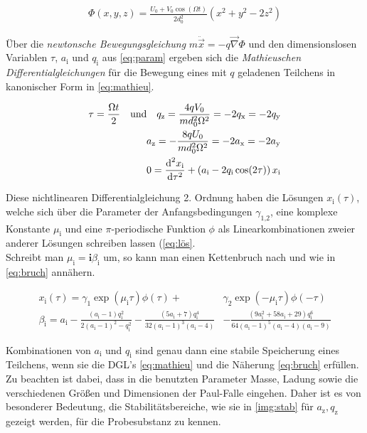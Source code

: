 \documentclass[numbers=noenddot,a4paper,notitlepage,twoside,BCOR15mm]{scrartcl}
\newcommand{\diff}{\textnormal{d}}
\newcommand{\ix}[1]{_\text{#1}}
\newcommand{\imag}{\mathbf{i}}
\newcommand{\tilt}[1]{\textit{#1}}
\begin{document}
			\begin{align}
				\Phi(x,y,z)=\frac{U\ix{0}+V\ix{0}\cos(\Omega t)}{2d\ix{0}^2}(x^2+y^2-2z^2) \label{eq:neupot}
			\end{align}

		Über die \tilt{newtonsche Bewegungsgleichung} $m\ddot{\vec{x}}=-q\vec{\nabla}\Phi$ und den dimensionslosen Variablen $\tau$, $a\ix{i}$ und $q\ix{i}$ aus \autoref{eq:param} ergeben sich die \tilt{Mathieuschen Differentialgleichungen} für die Bewegung eines mit $q$ geladenen Teilchens in kanonischer Form in \autoref{eq:mathieu}.

			\begin{align}
				\tau=\frac{\Omega t}{2} \quad \text{und} \quad q\ix{z}=\frac{4qV\ix{0}}{md\ix{0}^2\Omega^2}=-2q\ix{x}=-2q\ix{y} \label{eq:param}\\
				a\ix{z}=-\frac{8qU\ix{0}}{md\ix{0}^2\Omega^2}=-2a\ix{x}=-2a\ix{y} \nonumber \\
				0=\frac{\diff^2x\ix{i}}{\diff\tau^2}+\left(a\ix{i}-2q\ix{i}\cos(2\tau)\right)x\ix{i} \label{eq:mathieu}
			\end{align}

		Diese nichtlinearen Differentialgleichung 2. Ordnung haben die Lösungen $x\ix{i}(\tau)$, welche sich über die Parameter der Anfangsbedingungen $\gamma\ix{1,2}$, eine komplexe Konstante $\mu\ix{i}$ und eine $\pi$-periodische Funktion $\phi$ als Linearkombinationen zweier anderer Lösungen schreiben lassen (\autoref{eq:lös}.\\
		Schreibt man $\mu\ix{i}=\imag\beta\ix{i}$ um, so kann man einen Kettenbruch nach \cite{Bruch} und \cite{Bruch2} wie in \autoref{eq:bruch} annähern.

			\begin{align}
				x\ix{i}(\tau)=\gamma\ix{1}\exp(\mu\ix{i}\tau)\phi(\tau)+&\gamma\ix{2}\exp(-\mu\ix{i}\tau)\phi(-\tau) \label{eq:lös} \\
				\beta\ix{i}=a\ix{i}-\frac{(a\ix{i}-1)q\ix{i}^2}{2(a\ix{i}-1)^2-q\ix{i}^2}-\frac{(5a\ix{i}+7)q\ix{i}^4}{32(a\ix{i}-1)^3(a\ix{i}-4)}&-\frac{(9a\ix{i}^2+58a\ix{i}+29)q\ix{i}^6}{64(a\ix{i}-1)^5(a\ix{i}-4)(a\ix{i}-9)} \label{eq:bruch}
			\end{align}

		Kombinationen von $a\ix{i}$ und $q\ix{i}$ sind genau dann eine stabile Speicherung eines Teilchens, wenn sie die DGL's \autoref{eq:mathieu} und die Näherung \autoref{eq:bruch} erfüllen. Zu beachten ist dabei, dass in die benutzten Parameter Masse, Ladung sowie die verschiedenen Größen und Dimensionen der Paul-Falle eingehen. Daher ist es von besonderer Bedeutung, die Stabilitätsbereiche, wie sie in \autoref{img:stab} für $a\ix{z},q\ix{z}$ gezeigt werden, für die Probesubstanz zu kennen.
\end{document}
